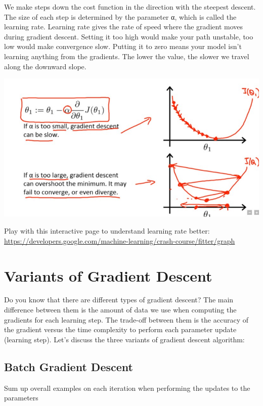 \documentclass{42-en}
\begin{document}
We make steps down the cost function in the direction with the steepest descent. The size of each step is determined by the parameter α, which is called the  learning rate. Learning rate gives the rate of speed where the gradient moves during gradient descent. Setting it too high would make your path unstable, too low would make convergence slow. Putting it to zero means your model isn't learning anything from the gradients.  The lower the value, the slower we travel along the downward slope.\\

\centerline{\includegraphics[width=150mm]{images/cost_grad_info.png}}

Play with this interactive page to understand learning rate better:\\
\href{https://developers.google.com/machine-learning/crash-course/fitter/graph}{https://developers.google.com/machine-learning/crash-course/fitter/graph}

\section*{Variants of Gradient Descent}

Do you know that there are different types of gradient descent? The main difference between them is the amount of data we use when computing the gradients for each learning step. The trade-off between them is the accuracy of the gradient versus the time complexity to perform each parameter update (learning step).
Let’s discuss the three variants of gradient descent algorithm:
\subsection*{Batch Gradient Descent}
Sum up overall examples on each iteration when performing the updates to the parameters\\
\end{document}
